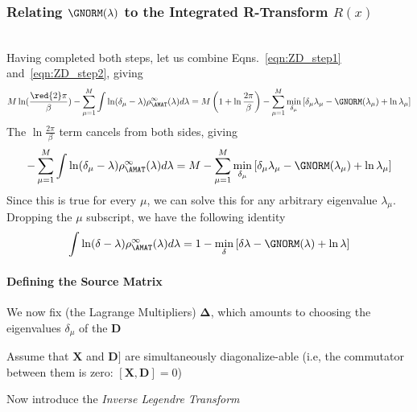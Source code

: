 \subsubsection{Relating $\GNORM(\lambda)$ to the Integrated R-Transform $R(x)$}
\label{sxn:tanaka_end}
\\
Having completed both steps, let us combine Eqns.~\ref{eqn:ZD_step1} and~\ref{eqn:ZD_step2}, giving
\begin{align}
M\ln(\dfrac{\red{2}\pi}{\beta})-\sum_{\mu=1}^{M}\int \ln(\delta_{\mu}-\lambda)\rho^{\infty}_{\AMAT}(\lambda)d\lambda
=
M \left( 1 + \ln \frac{2\pi}{\beta} \right) - \sum_{\mu=1}^{M} \min_{\delta_{\mu}} \left[\delta_{\mu}\lambda_{\mu}
- \GNORM(\lambda_{\mu}) + \ln \lambda_{\mu} \right] 
\end{align}
The $\ln \frac{2\pi}{\beta}$ term cancels from both sides, giving
\begin{align}
-\sum_{\mu=1}^{M}\int \ln(\delta_{\mu}-\lambda)\rho^{\infty}_{\AMAT}(\lambda)d\lambda
=
M - \sum_{\mu=1}^{M} \min_{\delta_{\mu}} \left[\delta_{\mu}\lambda_{\mu}
- \GNORM(\lambda_{\mu}) + \ln \lambda_{\mu} \right] 
\end{align}
Since this is true for every $\mu$, we can solve this for any arbitrary eigenvalue $\lambda_{\mu}$.
Dropping the $\mu$ subscript, we have the following identity
\begin{align}
\int \ln(\delta-\lambda)\rho^{\infty}_{\AMAT}(\lambda)d\lambda
=
1 - \min_{\delta} \left[\delta\lambda - \GNORM(\lambda) + \ln \lambda \right] 
\end{align}


\paragraph{Defining the Source Matrix}
We now fix (the Lagrange Multipliers) $\mathbf{\Delta}$, which amounts to choosing the eigenvalues $\delta_{\mu}$ of the \SourceMatrix $\mathbf{D}$

Assume that
$\mathbf{X}$ and $\mathbf{D}]$ are simultaneously diagonalize-able  (i.e, the commutator between them is zero:
$[\mathbf{X}, \mathbf{D}]=0$)


Now introduce the
\emph{Inverse Legendre Transform}

